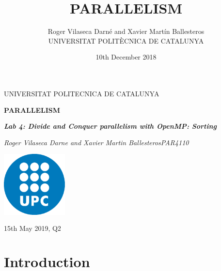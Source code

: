 \documentclass[12pt, a4paper]{article}
\title{PARALLELISM}
\author{Roger Vilaseca Darné and Xavier Martín Ballesteros\\
  \small UNIVERSITAT POLITÈCNICA DE CATALUNYA\\
}
\date{10th December 2018}
\begin{document}
\graphicspath{ {./images} }


\begin{titlepage}
	\centering
	\vspace{1cm}
	{\scshape\Large UNIVERSITAT POLITECNICA DE CATALUNYA\par}
	\vspace{1.5cm}
	{\huge\bfseries PARALLELISM\par}
	\vspace{2cm}
	{\Large\itshape \textbf{Lab 4: Divide and Conquer parallelism with OpenMP: Sorting}\par}
	\vfill
	{\Large\itshape Roger Vilaseca Darne and Xavier Martin Ballesteros\break PAR4110\par}
	\vfill
	\includegraphics[width=0.25\textwidth]{./images/UPC.png}\par\vspace{1cm}

	\vfill

	{\large 15th May 2019, Q2}
\end{titlepage}


\setcounter{secnumdepth}{5}

\newpage
  \tableofcontents
\newpage


\section{Introduction}
\end{document}
